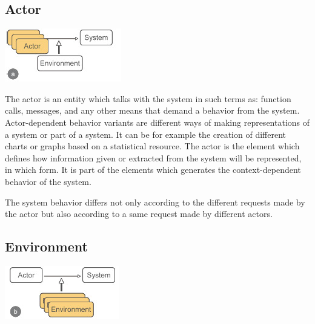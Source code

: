 \documentclass[journal,10pt,compsoc]{IEEEtran}
\begin{document}
\subsection{Actor}
\label{sec:org2802b05}
\begin{center}
\includegraphics[width=.9\linewidth]{./actor.jpg}
\end{center}
The actor is an entity which talks with the system in such terms as: function calls, messages, and any other means that demand
a behavior from the system.
Actor-dependent behavior variants are different ways of making representations of a system or part of a system. It can be for
example the creation of different charts or graphs based on a statistical resource. The actor is the element which defines how information 
given or extracted from the system will be represented, in which form. It is part of the elements which generates the context-dependent
behavior of the system. 

The system behavior differs not only according to the different requests made by the actor
but also according to a same request made by different actors. 

\subsection{Environment}
\label{sec:orgcb9843c}
\begin{center}
\includegraphics[width=.9\linewidth]{./environment.jpg}
\end{center}
\end{document}
